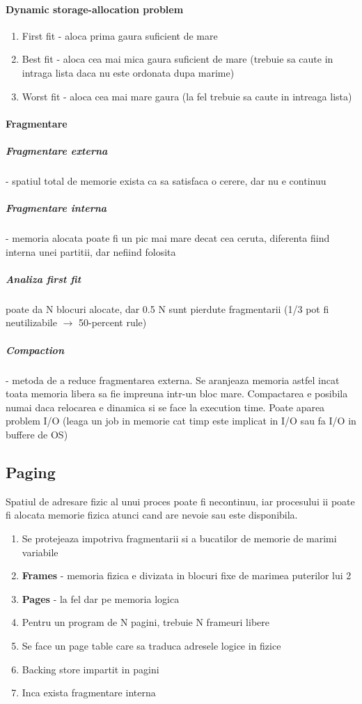 \documentclass{article}
\begin{document}
\paragraph*{Dynamic storage-allocation problem}
\begin{enumerate}
    \item First fit - aloca prima gaura suficient de mare
    \item Best fit - aloca cea mai mica gaura suficient de mare (trebuie sa caute in intraga lista daca nu este ordonata dupa marime)
    \item Worst fit - aloca cea mai mare gaura (la fel trebuie sa caute in intreaga lista)
\end{enumerate}

\paragraph*{Fragmentare}
\subparagraph*{Fragmentare externa} - spatiul total de memorie exista ca sa satisfaca o cerere, dar nu e continuu
\subparagraph*{Fragmentare interna} - memoria alocata poate fi un pic mai mare decat cea ceruta, diferenta fiind interna unei partitii, dar nefiind folosita
\subparagraph*{Analiza first fit} poate da N blocuri alocate, dar 0.5 N sunt pierdute fragmentarii (1/3 pot fi neutilizabile $\rightarrow$ 50-percent rule)
\subparagraph*{Compaction} - metoda de a reduce fragmentarea externa. Se aranjeaza memoria astfel incat toata memoria libera sa fie impreuna intr-un bloc mare. Compactarea e posibila numai daca relocarea e dinamica si se face la execution time. Poate aparea problem I/O (leaga un job in memorie cat timp este implicat in I/O sau fa I/O in buffere de OS)

\subsection*{Paging}
Spatiul de adresare fizic al unui proces poate fi necontinuu, iar procesului ii poate fi alocata memorie fizica atunci cand are nevoie sau este disponibila.
\begin{enumerate}
    \item Se protejeaza impotriva fragmentarii si a bucatilor de memorie de marimi variabile
    \item \textbf{Frames} - memoria fizica e divizata in blocuri fixe de marimea puterilor lui 2
    \item \textbf{Pages} - la fel dar pe memoria logica
    \item Pentru un program de N pagini, trebuie N frameuri libere
    \item Se face un page table care sa traduca adresele logice in fizice
    \item Backing store impartit in pagini
    \item Inca exista fragmentare interna
\end{enumerate}
\end{document}
